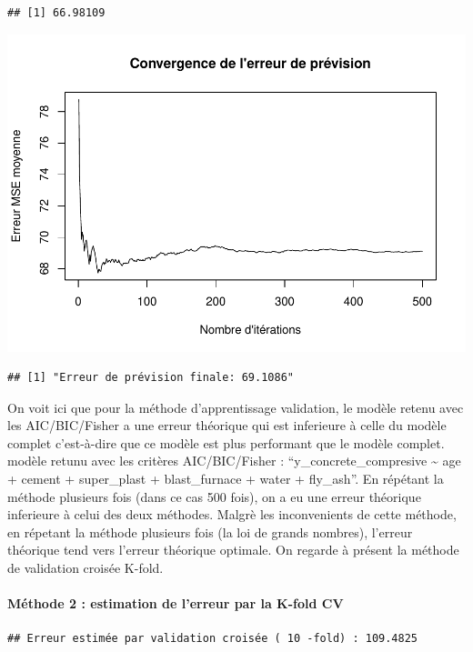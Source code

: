 \documentclass[
  12pt,
]{article}
\begin{document}
\begin{verbatim}
## [1] 66.98109
\end{verbatim}

\includegraphics{rmd_final_files/figure-latex/unnamed-chunk-50-1.pdf}

\begin{verbatim}
## [1] "Erreur de prévision finale: 69.1086"
\end{verbatim}

On voit ici que pour la méthode d'apprentissage validation, le modèle
retenu avec les AIC/BIC/Fisher a une erreur théorique qui est inferieure
à celle du modèle complet c'est-à-dire que ce modèle est plus performant
que le modèle complet. modèle retunu avec les critères AIC/BIC/Fisher :
``y\_concrete\_compresive \textasciitilde{} age + cement + super\_plast
+ blast\_furnace + water + fly\_ash''. En répétant la méthode plusieurs
fois (dans ce cas 500 fois), on a eu une erreur théorique inferieure à
celui des deux méthodes. Malgrè les inconvenients de cette méthode, en
répetant la méthode plusieurs fois (la loi de grands nombres), l'erreur
théorique tend vers l'erreur théorique optimale. On regarde à présent la
méthode de validation croisée K-fold.

\paragraph{Méthode 2 : estimation de l'erreur par la K-fold
CV}\label{muxe9thode-2-estimation-de-lerreur-par-la-k-fold-cv}

\begin{verbatim}
## Erreur estimée par validation croisée ( 10 -fold) : 109.4825
\end{verbatim}
\end{document}
